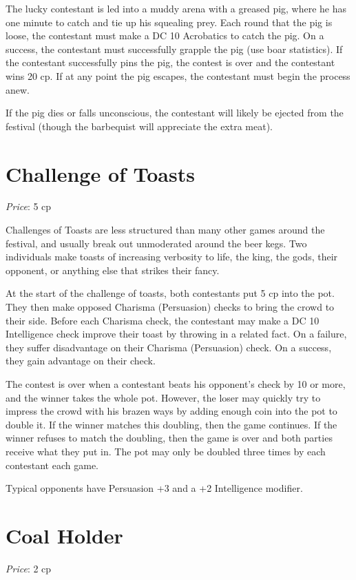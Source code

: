 \documentclass[10pt,a4paper,twoside,bg=print,twocolumn,openany,nodeprecatedcode]{dndbook}
\begin{document}
The lucky contestant is led into a muddy arena with a greased pig, where he has one minute to catch and tie up his squealing prey. Each round that the pig is loose, the contestant must make a DC 10 Acrobatics to catch the pig. On a success, the contestant must successfully grapple the pig (use boar statistics). If the contestant successfully pins the pig, the contest is over and the contestant wins 20 cp. If at any point the pig escapes, the contestant must begin the process anew.

If the pig dies or falls unconscious, the contestant will likely be ejected from the festival (though the barbequist will appreciate the extra meat).

\section{Challenge of Toasts}
\textit{Price}: 5 cp

Challenges of Toasts are less structured than many other games around the festival, and usually break out unmoderated around the beer kegs. Two individuals make toasts of increasing verbosity to life, the king, the gods, their opponent, or anything else that strikes their fancy.

At the start of the challenge of toasts, both contestants put 5 cp into the pot. They then make opposed Charisma (Persuasion) checks to bring the crowd to their side. Before each Charisma check, the contestant may make a DC 10 Intelligence check improve their toast by throwing in a related fact. On a failure, they suffer disadvantage on their Charisma (Persuasion) check. On a success, they gain advantage on their check.

The contest is over when a contestant beats his opponent's check by 10 or more, and the winner takes the whole pot. However, the loser may quickly try to impress the crowd with his brazen ways by adding enough coin into the pot to double it. If the winner matches this doubling, then the game continues. If the winner refuses to match the doubling, then the game is over and both parties receive what they put in. The pot may only be doubled three times by each contestant each game.

Typical opponents have Persuasion +3 and a +2 Intelligence modifier.

\section{Coal Holder}
\textit{Price}: 2 cp
\end{document}
